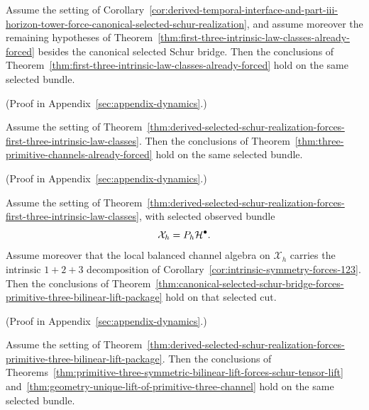 \begin{theorem}
\label{thm:derived-selected-schur-realization-forces-first-three-intrinsic-law-classes}
Assume the setting of
Corollary~\ref{cor:derived-temporal-interface-and-part-iii-horizon-tower-force-canonical-selected-schur-realization},
and assume moreover the remaining hypotheses of
Theorem~\ref{thm:first-three-intrinsic-law-classes-already-forced}
besides the canonical selected Schur bridge. Then the conclusions of
Theorem~\ref{thm:first-three-intrinsic-law-classes-already-forced}
hold on the same selected bundle.
\end{theorem}

(Proof in Appendix~\ref{sec:appendix-dynamics}.)

\begin{corollary}
\label{cor:derived-selected-schur-realization-forces-three-primitive-channels}
Assume the setting of
Theorem~\ref{thm:derived-selected-schur-realization-forces-first-three-intrinsic-law-classes}.
Then the conclusions of
Theorem~\ref{thm:three-primitive-channels-already-forced}
hold on the same selected bundle.
\end{corollary}

(Proof in Appendix~\ref{sec:appendix-dynamics}.)

\begin{theorem}
\label{thm:derived-selected-schur-realization-forces-primitive-three-bilinear-lift-package}
Assume the setting of
Theorem~\ref{thm:derived-selected-schur-realization-forces-first-three-intrinsic-law-classes},
with selected observed bundle
\[
\mathcal X_h=P_h\mathcal{H}^\bullet.
\]
Assume moreover that the local balanced channel algebra on \(\mathcal X_h\)
carries the intrinsic \(1+2+3\) decomposition of
Corollary~\ref{cor:intrinsic-symmetry-forces-123}. Then the conclusions of
Theorem~\ref{thm:canonical-selected-schur-bridge-forces-primitive-three-bilinear-lift-package}
hold on that selected cut.
\end{theorem}

(Proof in Appendix~\ref{sec:appendix-dynamics}.)

\begin{corollary}
\label{cor:derived-selected-schur-realization-forces-geometric-lift-and-four-intrinsic-laws}
Assume the setting of
Theorem~\ref{thm:derived-selected-schur-realization-forces-primitive-three-bilinear-lift-package}.
Then the conclusions of
Theorems~\ref{thm:primitive-three-symmetric-bilinear-lift-forces-schur-tensor-lift}
and~\ref{thm:geometry-unique-lift-of-primitive-three-channel}
hold on the same selected bundle.
\end{corollary}

